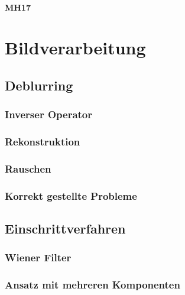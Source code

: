 \documentclass[a4paper, 11pt, accentcolor = tud3b]{tudreport}
\begin{document}
				\subsubsection{MH17} %

	\chapter{Bildverarbeitung} %

		\section{Deblurring} %

			\subsection{Inverser Operator} %

			\subsection{Rekonstruktion} %

			\subsection{Rauschen} %

			\subsection{Korrekt gestellte Probleme} %

		\section{Einschrittverfahren} %

			\subsection{Wiener Filter} %

			\subsection{Ansatz mit mehreren Komponenten} %
\end{document}
